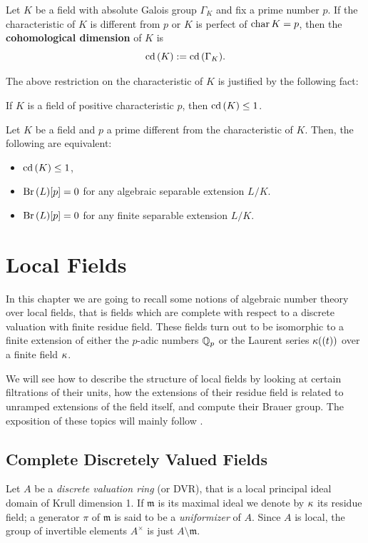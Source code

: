 \documentclass[a4paper, oneside]{memoir}
\begin{document}
\begin{definition}
	Let $K$ be a field with absolute Galois group $\Gamma_K$ and fix a prime number $p$. If the characteristic of $K$ is different from $p$ or $K$ is perfect of $\operatorname{char}{K}=p$, then the \textbf{cohomological dimension} of $K$ is
	\[
		\operatorname{cd}{(K)}:=\operatorname{cd}{(\Gamma_K)}.
	\]
\end{definition}

The above restriction on the characteristic of $K$ is justified by the following fact:

\begin{proposition}\label{prop:CdCharP}
	If $K$ is a field of positive characteristic $p$, then $\operatorname{cd}{(K)}\leq 1$.
\end{proposition}

\begin{proposition}\label{prop:CdBr}
	Let $K$ be a field and $p$ a prime different from the characteristic of $K$. Then, the following are equivalent:
	\begin{itemize}
		\item $\operatorname{cd}{(K)}\leq 1$,
		\item $\operatorname{Br}{(L)}[p]=0$ for any algebraic separable extension $L/K$.
		\item $\operatorname{Br}{(L)}[p]=0$ for any finite separable extension $L/K$.
	\end{itemize}
\end{proposition}


\chapter{Local Fields}
In this chapter we are going to recall some notions of algebraic number theory over local fields, that is fields which are complete with respect to a discrete valuation with finite
residue field. These fields turn out to be isomorphic to a finite extension of either the $p$-adic numbers $\mathbb{Q}_p$ or the Laurent series $\kappa((t))$ over a finite field $\kappa$.

We will see how to describe the structure of local fields by looking at certain filtrations of their units, how the extensions of their residue field is related to unramped
extensions of the field itself, and compute their Brauer group. The exposition of these topics will mainly follow \cite{SerreCL}.

\section{Complete Discretely Valued Fields}
Let $A$ be a \textit{discrete valuation ring} (or DVR), that is a local principal ideal domain of Krull dimension 1. If $\mathfrak{m}$ is its maximal ideal we denote by $\kappa$ its
residue field; a generator $\pi$ of $\mathfrak{m}$ is said to be a \textit{uniformizer} of $A$. Since $A$ is local, the group of invertible elements $A^\times$ is just
$A\setminus\mathfrak{m}$.
\end{document}
